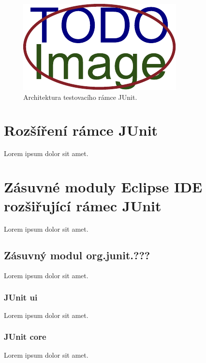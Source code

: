     \begin{figure}[!h]
      \includegraphics[width=\textwidth, center]{obrazky-figures/placeholder.pdf}
      \caption{Architektura testovacího rámce JUnit.}
      \label{fig:junit_arch}
    \end{figure}

  \section{Rozšíření rámce JUnit}
  Lorem ipsum dolor sit amet.

  \section{Zásuvné moduly Eclipse IDE rozšiřující rámec JUnit}
  Lorem ipsum dolor sit amet.
    \subsection{Zásuvný modul org.junit.???}
    Lorem ipsum dolor sit amet.
    \subsubsection{JUnit ui}
    Lorem ipsum dolor sit amet.
    \subsubsection{JUnit core}
    Lorem ipsum dolor sit amet.

